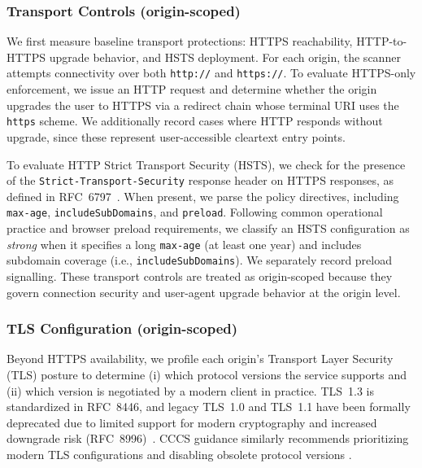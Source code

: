 \documentclass[a4paper,fleqn]{cas-sc}
\begin{document}
    \subsubsection{Transport Controls (origin-scoped)}\label{sec:transport_controls}
    We first measure baseline transport protections: HTTPS reachability, HTTP-to-HTTPS upgrade behavior, and HSTS deployment. For each origin, the scanner attempts connectivity over both \texttt{http://} and \texttt{https://}. To evaluate HTTPS-only enforcement, we issue an HTTP request and determine whether the origin upgrades the user to HTTPS via a redirect chain whose terminal URI uses the \texttt{https} scheme.
    We additionally record cases where HTTP responds without upgrade, since these represent user-accessible cleartext entry points.

    To evaluate HTTP Strict Transport Security (HSTS), we check for the presence of the \texttt{Strict-Transport-Security} response header on HTTPS responses, as defined in RFC~6797~\cite{rfc6797}. When present, we parse the policy directives, including \texttt{max-age}, \texttt{includeSubDomains}, and \texttt{preload}. Following common operational practice and browser preload requirements, we classify an HSTS configuration as \emph{strong} when it specifies a long \texttt{max-age} (at least one year) and includes subdomain coverage (i.e., \texttt{includeSubDomains}). We separately record preload signalling. These transport controls are treated as origin-scoped because they govern connection security and user-agent upgrade behavior at the origin level.


\subsubsection{TLS Configuration (origin-scoped)}\label{sec:tls_configuration}
    Beyond HTTPS availability, we profile each origin's Transport Layer Security (TLS) posture to determine
    (i) which protocol versions the service supports and 
    (ii) which version is negotiated by a modern client in practice. 
    TLS~1.3 is standardized in RFC~8446, and legacy TLS~1.0 and TLS~1.1 have been formally deprecated due to limited support for modern cryptography and increased downgrade risk (RFC~8996)~\cite{rfc8446,rfc8996}. CCCS guidance similarly recommends prioritizing modern TLS configurations and disabling obsolete protocol versions \cite{cccs-itsp-40062}.
    
\end{document}
